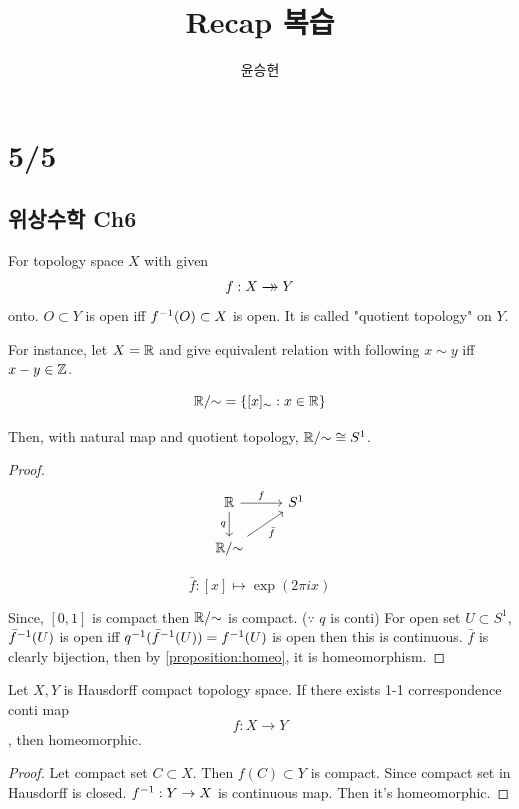 \documentclass{article}
\title{Recap 복습}
\author{윤승현}
\begin{document}
\maketitle

\section*{5/5}

\subsection{위상수학 Ch6}

\begin{definition}
    For topology space $X$ with given \[f: X \xrightarrow[]{}\mathrel{\mkern-14mu}\rightarrow Y \] onto. $O \subset Y$ is open iff $f^{-1}(O) \subset X$ is open. It is called "quotient topology" on $Y$.
\end{definition}

For instance, let $X = \mathbb{R}$ and give equivalent relation with following $x \sim y$ iff $x-y \in \mathbb{Z}$.

\[
\mathbb{R}/{\sim} = \left\{ [x]_{\sim} : x \in \mathbb{R} \right\}
\]

\begin{proposition}
Then, with natural map and quotient topology, $\mathbb{R}/{\sim} \cong S^1$.
\end{proposition}

\begin{proof}
\[
\begin{tikzcd}
\R \arrow[r, "f"] \arrow[d, "q"'] & S^1 \\
\R/{\sim} \arrow[ur, "\bar f"']
\end{tikzcd}
\]

\[
    \bar f : [x] \mapsto \exp(2\pi i x)
\]

Since, $[0, 1]$ is compact then $\mathbb{R}/{\sim}$ is compact. ($\because$ $q$ is conti) For open set $U \subset S^1$, $\bar f^{-1}(U)$ is open iff $q^{-1}(\bar f^{-1}(U))=f^{-1}(U)$ is open then this is continuous. $\bar f$ is clearly bijection, then by \cref{proposition:homeo}, it is homeomorphism.

\end{proof}

\begin{proposition}
    Let $X, Y$ is Hausdorff compact topology space. If there exists 1-1 correspondence conti map \[f: X \to Y\], then homeomorphic.
    \label{proposition:homeo}
\end{proposition}

\begin{proof}
    Let compact set $C \subset X$. Then $f(C) \subset Y$ is compact. Since compact set in Hausdorff is closed. $f^{-1}: Y \to X$ is continuous map. Then it's homeomorphic.
\end{proof}
\end{document}
